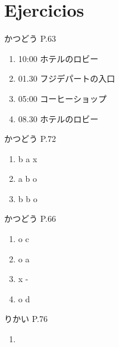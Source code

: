 \documentclass[a4paper,lualatex,ja=standard,base=10pt]{bxjsarticle}
\begin{document}
\section{Ejercicios}

かつどう P.63

\begin{enumerate}
  \item 10:00 ホテルのロビー
  \item 01.30 フジデパートの入口
  \item 05:00 コーヒーショップ
  \item 08.30 ホテルのロビー
\end{enumerate}

かつどう P.72

\begin{enumerate}
  \item b a x
  \item a b o
  \item b b o
\end{enumerate}

かつどう P.66

\begin{enumerate}
  \item o c
  \item o a
  \item x -
  \item o d
\end{enumerate}

りかい P.76

\begin{enumerate}
  \item 
\end{enumerate}
\end{document}
